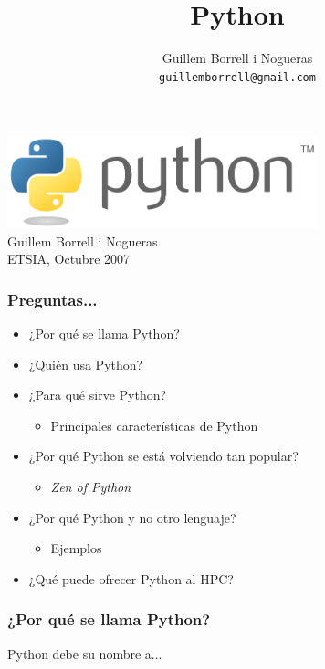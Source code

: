 \documentclass{beamer}
\title{Python}
\author{
Guillem Borrell i Nogueras\\
\texttt{guillemborrell@gmail.com}
}
\begin{document}
\begin{frame}
\begin{center}
 \includegraphics[width=9cm]{files/python-logo-generic.pdf}\\
Guillem Borrell i Nogueras\\

ETSIA, Octubre 2007
\end{center}

\end{frame}


\begin{frame}
 \frametitle{Preguntas...}
 \begin{itemize}
 \item ¿Por qué se llama Python?
 \item ¿Quién usa Python?
 \item ¿Para qué sirve Python?
 \begin{itemize}
  \item Principales características de Python
 \end{itemize}
 \item ¿Por qué Python se está volviendo tan popular?
 \begin{itemize}
  \item \emph{Zen of Python}
 \end{itemize}
 \item ¿Por qué Python y no otro lenguaje?
 \begin{itemize}
  \item Ejemplos
 \end{itemize}

 \item ¿Qué puede ofrecer Python al HPC?
 \end{itemize}
\end{frame}

\begin{frame}
 \frametitle{¿Por qué se llama Python?}
 Python debe su nombre a...
\end{frame}
\end{document}
